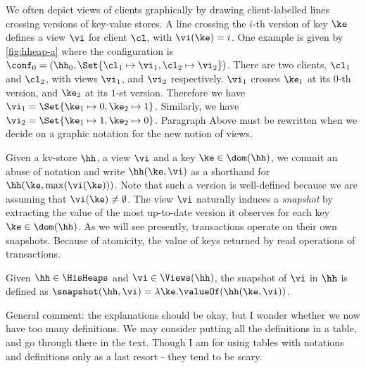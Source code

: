 {\color{red} We often depict views of clients graphically by drawing client-labelled lines crossing 
versions of key-value stores. A line crossing the $i$-th version of key $\ke$ defines a view 
$\vi$ for client $\cl$, with $\vi(\ke) = i$. One example is given by \cref{fig:hheap-a} where the configuration is
$\conf_0 = (\hh_0, \Set{\cl_1 \mapsto \vi_1, \cl_2 \mapsto \vi_2})$. 
There are two clients, 
$\cl_1$ and $\cl_2$, with views $\vi_1$, and $\vi_2$ respectively. $\vi_1$ crosses $\ke_1$ at its $0$-th 
version, and $\ke_2$ at its $1$-st version. Therefore we have $\vi_1 = \Set{\ke_1 \mapsto 0, \ke_2 \mapsto 1}$. 
Similarly, we have $\vi_2 = \Set{\ke_1 \mapsto 1, \ke_2 \mapsto 0}$. }
\ac{Paragraph Above must be rewritten when we decide on a graphic notation for 
the new notion of views.}

Given a kv-store $\hh$, a view $\vi$ and a key $\ke \in \dom(\hh)$, 
we commit an abuse of notation and write $\hh(\ke, \vi)$ as a shorthand 
for $\hh(\ke, \max(\vi(\ke)))$. Note that such a version is well-defined because 
we are assuming that $\vi(\ke) \neq \emptyset$.
The view $\vi$ naturally induces a \emph{snapshot} 
by extracting the value of the most up-to-date version it observes for each key $\ke \in \dom(\hh)$. 
As we will see presently, transactions operate on their own snapshots.
Because of atomicity, the value of keys returned 
by read operations of transactions. 
\begin{definition}[Snapshots]
\label{def:heaps}
\label{def:snapshot}
Given $\hh \in \HisHeaps$ and $\vi \in \Views(\hh)$, the snapshot of $\vi$ in 
$\hh$ is defined as $\snapshot(\hh, \vi) = \lambda \ke. \valueOf(\hh(\ke, \vi))$.
\end{definition}

\ac{General comment: the explanations should be okay, but I wonder whether we now have 
too many definitions. We may consider putting all the definitions in a table, and 
go through there in the text. Though I am for using tables with notations and 
definitions only as a last resort - they tend to be scary.}

